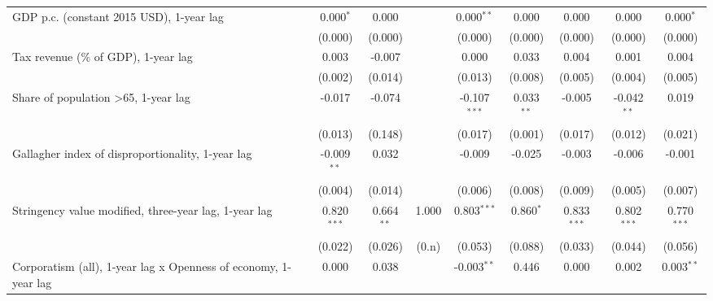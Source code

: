 \begin{table}[htbp]
\begin{tabular}{lcccccccc}
      GDP p.c. (constant 2015 USD), 1-year lag                        & 0.000$^{*}$   & 0.000                     &              & 0.000$^{**}$   & 0.000            & 0.000           & 0.000           & 0.000$^{*}$\\   
                                                                      & (0.000)       & (0.000)                   &              & (0.000)        & (0.000)          & (0.000)         & (0.000)         & (0.000)\\   
      Tax revenue (\% of GDP), 1-year lag                             & 0.003         & -0.007                    &              & 0.000          & 0.033            & 0.004           & 0.001           & 0.004\\   
                                                                      & (0.002)       & (0.014)                   &              & (0.013)        & (0.008)          & (0.005)         & (0.004)         & (0.005)\\   
      Share of population >65, 1-year lag                             & -0.017        & -0.074                    &              & -0.107$^{***}$ & 0.033$^{**}$     & -0.005          & -0.042$^{**}$   & 0.019\\   
                                                                      & (0.013)       & (0.148)                   &              & (0.017)        & (0.001)          & (0.017)         & (0.012)         & (0.021)\\   
      Gallagher index of disproportionality, 1-year lag               & -0.009$^{**}$ & 0.032                     &              & -0.009         & -0.025           & -0.003          & -0.006          & -0.001\\   
                                                                      & (0.004)       & (0.014)                   &              & (0.006)        & (0.008)          & (0.009)         & (0.005)         & (0.007)\\   
      Stringency value modified, three-year lag, 1-year lag           & 0.820$^{***}$ & 0.664$^{**}$              & 1.000        & 0.803$^{***}$  & 0.860$^{*}$      & 0.833$^{***}$   & 0.802$^{***}$   & 0.770$^{***}$\\   
                                                                      & (0.022)       & (0.026)                   & (0.n)        & (0.053)        & (0.088)          & (0.033)         & (0.044)         & (0.056)\\   
      Corporatism (all), 1-year lag x Openness of economy, 1-year lag & 0.000         & 0.038                     &              & -0.003$^{**}$  & 0.446            & 0.000           & 0.002           & 0.003$^{**}$\\   

\end{tabular}
\end{table}
